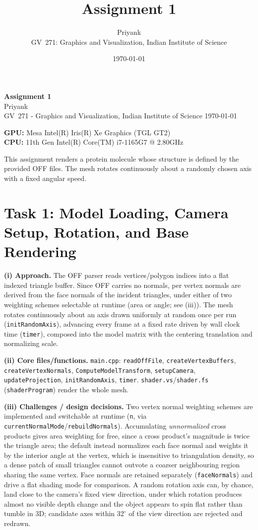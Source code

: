 \documentclass[10pt]{article}
\title{\vspace{-2em}\large Assignment 1}
\author{\normalsize Priyank \\ \footnotesize GV~271: Graphics and Visualization, Indian Institute of Science}
\date{\footnotesize \today}
\begin{document}
\begin{center}
{\large\textbf{Assignment 1}}\\[2pt]
{\normalsize Priyank}\\
{\footnotesize GV~271 - Graphics and Visualization, Indian Institute of Science \quad\textbullet\quad \today}
\end{center}
\vspace{2pt}

\textbf{GPU:} Mesa Intel(R) Iris(R) Xe Graphics (TGL GT2)\\
\textbf{CPU:} 11th Gen Intel(R) Core(TM) i7-1165G7 @ 2.80GHz

\small
This assignment renders a protein molecule whose structure is defined by the provided OFF files. 
The mesh rotates continuously  about a randomly chosen axis with a fixed angular speed.


\section{Task 1: Model Loading, Camera Setup, Rotation, and Base Rendering}
\textbf{(i) Approach.} The OFF parser reads vertices/polygon indices into a flat indexed triangle buffer. 
Since OFF carries no normals, per vertex normals are derived from the face normals of the incident 
triangles, under either of two weighting schemes selectable at runtime (area or angle; see (iii)). 
The mesh rotates continuously about an axis drawn uniformly at random once per 
run (\texttt{initRandomAxis}), 
advancing every frame at a fixed rate driven by wall clock time 
(\texttt{timer}), composed into the model matrix with the centering 
translation and normalizing scale.

\textbf{(ii) Core files/functions.} \texttt{main.cpp}: \texttt{readOffFile}, 
\texttt{createVertexBuffers}, \texttt{createVertexNormals}, 
\texttt{ComputeModelTransform}, \texttt{setupCamera}, 
\texttt{updateProjection}, \texttt{initRandomAxis}, 
\texttt{timer}. \texttt{shader.vs}/\texttt{shader.fs} 
(\texttt{shaderProgram}) render the whole mesh.

\textbf{(iii) Challenges / design decisions.} Two vertex normal weighting
schemes are implemented and switchable at runtime (\texttt{n}, via
\texttt{currentNormalMode}/\texttt{rebuildNormals}). Accumulating
\emph{unnormalized} cross products gives area weighting for free, since a
cross product's magnitude is twice the triangle area; the default instead
normalizes each face normal and weights it by the interior angle at the
vertex, which is insensitive to triangulation density, so a dense patch of
small triangles cannot outvote a coarser neighbouring region sharing the
same vertex. Face normals are retained separately (\texttt{faceNormals})
and drive a flat shading mode for comparison. A random rotation axis can, by
chance, land close to the camera's fixed view direction, under which rotation
produces almost no visible depth change and the object appears to spin flat
rather than tumble in 3D; candidate axes within $32^\circ$ of the view direction
are rejected and redrawn.
\end{document}
